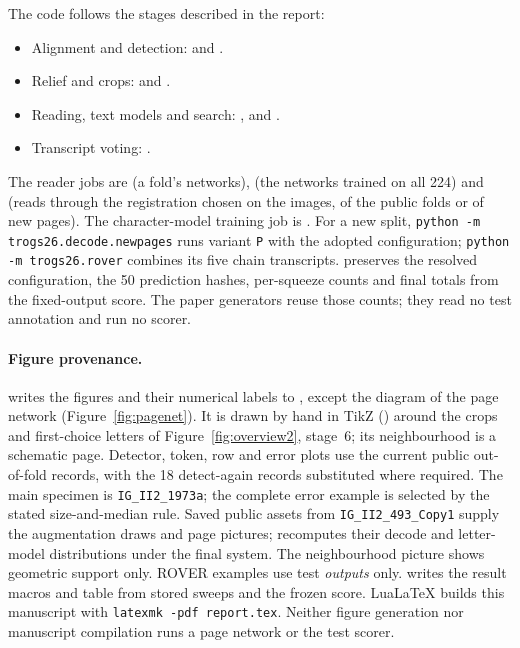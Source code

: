 \documentclass[11pt]{article}
\newcommand{\code}[1]{\texttt{#1}}
\begin{document}
The code follows the stages described in the report:
\begin{itemize}[nosep,beginpenalty=10000,midpenalty=10000]
\raggedright
\item Alignment and detection:  and
.
\item Relief and crops:  and .
\item Reading, text models and search: ,  and
.
\item Transcript voting: .
\end{itemize}
The reader jobs are  (a fold's networks),  (the
networks trained on all 224) and  (reads through the registration chosen on
the images, of the public folds or of new pages).
The character-model training job is .
For a new split, \code{python -m trogs26.decode.newpages} runs variant \code{P} with the adopted
configuration; \code{python -m trogs26.rover} combines its five chain transcripts.
 preserves the resolved
configuration, the 50 prediction hashes, per-squeeze counts and final totals from the fixed-output score.
The paper generators reuse those counts; they read no test annotation and run no scorer.

\paragraph{Figure provenance.}
 writes the figures and their numerical labels to , except
the diagram of the page network (Figure~\ref{fig:pagenet}). It is drawn by hand in TikZ
() around the crops and first-choice letters of Figure~\ref{fig:overview2},
stage~6; its neighbourhood is a schematic page.
Detector, token, row and error plots use the
current public out-of-fold records, with the 18 detect-again records substituted where required.
The main specimen is \code{IG\_II2\_1973a}; the complete error example is selected by the stated
size-and-median rule. Saved public assets from \code{IG\_II2\_493\_Copy1} supply the augmentation draws
and page pictures;  recomputes their decode and letter-model distributions
under the final system. The neighbourhood picture shows geometric support only. ROVER examples
use test \emph{outputs} only.  writes the
result macros and table from stored sweeps and the frozen score. LuaLaTeX builds this manuscript with
\code{latexmk -pdf report.tex}. Neither figure generation nor manuscript compilation runs a
page network or the test scorer.
\end{document}
